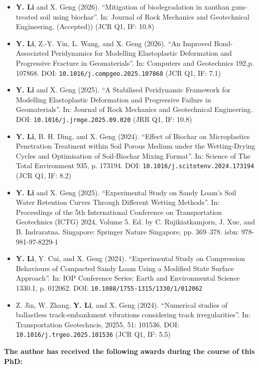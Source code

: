 \begin{itemize}
   \item \textbf{Y. Li} and X. Geng (2026). “Mitigation of biodegradation in xanthan gum-treated soil using biochar”. In: Journal of Rock Mechanics and Geotechnical Engineering. (Accepted)) (JCR Q1, IF: 10.8)
   \item \textbf{Y. Li}, Z.-Y. Yin, L. Wang, and X. Geng (2026). “An Improved Bond-Associated Peridynamics for Modelling Elastoplastic Deformation and Progressive Fracture in Geomaterials”. In: Computers and Geotechnics 192,p. 107868. DOI: \nolinkurl{10.1016/j.compgeo.2025.107868} (JCR Q1, IF: 7.1)
   \item \textbf{Y. Li} and X. Geng (2025). “A Stabilised Peridynamic Framework for Modelling Elastoplastic Deformation and Progressive Failure in Geomaterials”. In: Journal of Rock Mechanics and Geotechnical Engineering. DOI: \nolinkurl{10.1016/j.jrmge.2025.09.020} (JRR Q1, IF: 10.8)
   \item \textbf{Y. Li}, B. H. Ding, and X. Geng (2024). “Effect of Biochar on Microplastics Penetration Treatment within Soil Porous Medium under the Wetting-Drying Cycles and Optimisation of Soil-Biochar Mixing Format”. In: Science of The Total Environment 935, p. 173194. DOI: \nolinkurl{10.1016/j.scitotenv.2024.173194} (JCR Q1, IF: 8.2)
   \item \textbf{Y. Li} and X. Geng (2025). “Experimental Study on Sandy Loam’s Soil Water Retention Curves Through Different Wetting Methods”. In: Proceedings of the 5th International Conference on Transportation Geotechnics (ICTG) 2024, Volume 5. Ed. by C. Rujikiatkamjorn, J. Xue, and B. Indraratna. Singapore: Springer Nature Singapore, pp. 369–378. isbn: 978-981-97-8229-1
   \item \textbf{Y. Li}, Y. Cui, and X. Geng (2024). “Experimental Study on Compression Behaviours of Compacted Sandy Loam Using a Modified State Surface Approach”. In: IOP Conference Series: Earth and Environmental Science 1330.1, p. 012062. DOI: \nolinkurl{10.1088/1755-1315/1330/1/012062}
   \item Z. Jin, W. Zhang, \textbf{Y. Li}, and X. Geng (2024). “Numerical studies of ballastless track-embankment vibrations considering track irregularities”. In: Transportation Geotechncis, 20255, 51: 101536. DOI: \nolinkurl{10.1016/j.trgeo.2025.101536} (JCR Q1, IF: 5.5)
\end{itemize}
\noindent\textbf{The author has received the following awards during the course of this PhD:}\par
